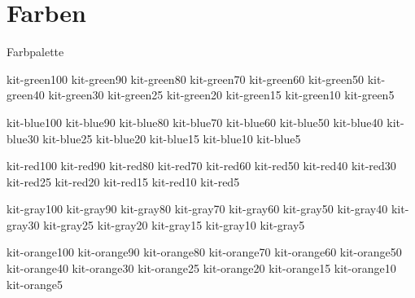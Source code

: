 \documentclass{sdqbeamer}
\begin{document}
\section{Farben}
\begin{frame}{Farbpalette}
\tiny

  \colorbox{kit-green100}{kit-green100}
  \colorbox{kit-green90}{kit-green90}
  \colorbox{kit-green80}{kit-green80}
  \colorbox{kit-green70}{kit-green70}
  \colorbox{kit-green60}{kit-green60}
  \colorbox{kit-green50}{kit-green50}
  \colorbox{kit-green40}{kit-green40}
  \colorbox{kit-green30}{kit-green30}
  \colorbox{kit-green25}{kit-green25}
  \colorbox{kit-green20}{kit-green20}
  \colorbox{kit-green15}{kit-green15}
  \colorbox{kit-green10}{kit-green10}
  \colorbox{kit-green5}{kit-green5}

  \colorbox{kit-blue100}{kit-blue100}
  \colorbox{kit-blue90}{kit-blue90}
  \colorbox{kit-blue80}{kit-blue80}
  \colorbox{kit-blue70}{kit-blue70}
  \colorbox{kit-blue60}{kit-blue60}
  \colorbox{kit-blue50}{kit-blue50}
  \colorbox{kit-blue40}{kit-blue40}
  \colorbox{kit-blue30}{kit-blue30}
  \colorbox{kit-blue25}{kit-blue25}
  \colorbox{kit-blue20}{kit-blue20}
  \colorbox{kit-blue15}{kit-blue15}
  \colorbox{kit-blue10}{kit-blue10}
  \colorbox{kit-blue5}{kit-blue5}

  \colorbox{kit-red100}{kit-red100}
  \colorbox{kit-red90}{kit-red90}
  \colorbox{kit-red80}{kit-red80}
  \colorbox{kit-red70}{kit-red70}
  \colorbox{kit-red60}{kit-red60}
  \colorbox{kit-red50}{kit-red50}
  \colorbox{kit-red40}{kit-red40}
  \colorbox{kit-red30}{kit-red30}
  \colorbox{kit-red25}{kit-red25}
  \colorbox{kit-red20}{kit-red20}
  \colorbox{kit-red15}{kit-red15}
  \colorbox{kit-red10}{kit-red10}
  \colorbox{kit-red5}{kit-red5}

  \colorbox{kit-gray100}{\color{white}kit-gray100}
  \colorbox{kit-gray90}{\color{white}kit-gray90}
  \colorbox{kit-gray80}{\color{white}kit-gray80}
  \colorbox{kit-gray70}{\color{white}kit-gray70}
  \colorbox{kit-gray60}{\color{white}kit-gray60}
  \colorbox{kit-gray50}{\color{white}kit-gray50}
  \colorbox{kit-gray40}{kit-gray40}
  \colorbox{kit-gray30}{kit-gray30}
  \colorbox{kit-gray25}{kit-gray25}
  \colorbox{kit-gray20}{kit-gray20}
  \colorbox{kit-gray15}{kit-gray15}
  \colorbox{kit-gray10}{kit-gray10}
  \colorbox{kit-gray5}{kit-gray5}

  \colorbox{kit-orange100}{kit-orange100}
  \colorbox{kit-orange90}{kit-orange90}
  \colorbox{kit-orange80}{kit-orange80}
  \colorbox{kit-orange70}{kit-orange70}
  \colorbox{kit-orange60}{kit-orange60}
  \colorbox{kit-orange50}{kit-orange50}
  \colorbox{kit-orange40}{kit-orange40}
  \colorbox{kit-orange30}{kit-orange30}
  \colorbox{kit-orange25}{kit-orange25}
  \colorbox{kit-orange20}{kit-orange20}
  \colorbox{kit-orange15}{kit-orange15}
  \colorbox{kit-orange10}{kit-orange10}
  \colorbox{kit-orange5}{kit-orange5}


\end{frame}
\end{document}
